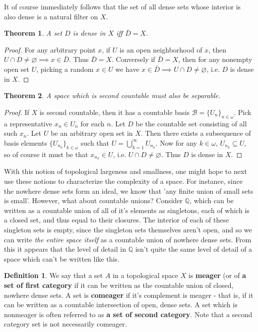 \documentclass{article}
\theoremstyle{definition}
\newtheorem{definition}{Definition}[section]
\theoremstyle{plain}
\theoremstyle{theorem}
\newtheorem{theorem}{Theorem}[section]
\begin{document}
It of course immediately follows that the set of all dense sets whose interior is also dense is a natural filter on $X$. 
\begin{theorem}
	A set $D$ is dense in $X$ iff $\bar{D} = X$.
\end{theorem}
\begin{proof}
	For any arbitrary point $x$, if $U$ is an open neighborhood of $x$, then $U \cap D \neq \varnothing \implies x \in \bar{D}$. Thus $\bar{D} = X$. Conversely if $\bar{D} = X$, then for any nonempty open set $U$, picking a random $x \in U$ we have $x \in \bar{D} \implies U \cap D \neq \varnothing$, i.e. $D$ is dense in $X$.
\end{proof}
\begin{theorem}
	A space which is second countable must also be separable.
\end{theorem}
\begin{proof}
	If $X$ is second countable, then it has a countable basis $\mathcal{B} = \{U_n\}_{n \in \omega}$. Pick a representative $x_n \in U_n$ for each $n$. Let $D$ be the countable set consisting of all such $x_n$. Let $U$ be an arbitrary open set in $X$. Then there exists a subsequence of basis elements $\{U_{n_k}\}_{k \in \omega}$ such that $U = \bigcup_{k=1}^{\infty}U_{n_k}$. Now for any $k \in \omega$, $U_{n_k} \subseteq U$, so of course it must be that $x_{n_k} \in U$, i.e. $U \cap D \neq \varnothing$. Thus $D$ is dense in $X$.
\end{proof}
With this notion of topological largeness and smallness, one might hope to next use these notions to characterize the complexity of a space. For instance, since the nowhere dense sets form an ideal, we know that 'any finite union of small sets is small'. However, what about countable unions? Consider $\mathbb{Q}$, which can be written as a countable union of all of it's elements as singletons, each of which is a closed set, and thus equal to their closures. The interior of each of these singleton sets is empty, since the singleton sets themselves aren't open, and so we can write \textit{the entire space itself} as a countable union of nowhere dense sets. From this it appears that the level of detail in $\mathbb{Q}$ isn't quite the same level of detail of a space which can't be written like this. 
\begin{definition}
	We say that a set $A$ in a topological space $X$ is \textbf{meager} (or of \textbf{a set of first category} if it can be written as the countable union of closed, nowhere dense sets. A set is \textbf{comeager} if it's complement is meager - that is, if it can be written as a countable intersection of open, dense sets. A set which is nonmeager is often referred to as \textbf{a set of second category}. Note that a second category set is not necessarily comeager.
\end{definition}
\end{document}
